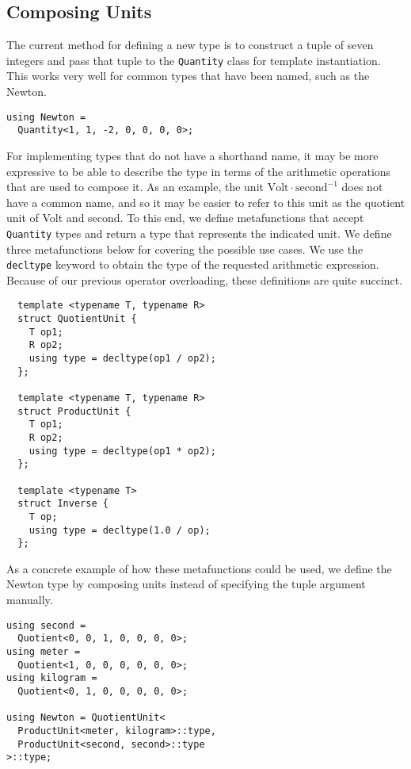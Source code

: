 \documentclass[reprint]{revtex4-1}
\begin{document}
\subsection{Composing Units}
The current method for defining a new type is to construct a tuple of seven integers and pass that
tuple to the \verb|Quantity| class for template instantiation. This works very well for common types
that have been named, such as the Newton.

\begin{verbatim}
using Newton =
  Quantity<1, 1, -2, 0, 0, 0, 0>;
\end{verbatim}

For implementing types that do not have a shorthand name, it may be more expressive to be able to
describe the type in terms of the arithmetic operations that are used to compose it. As an example, the unit
$\text{Volt} \cdot \text{second}^{-1}$ does not have a common name, and so it may be easier
to refer to this unit as the quotient unit of Volt and second.
To this end, we define metafunctions that accept \verb|Quantity| types and return a type that represents
the indicated unit. We define three metafunctions below for covering the possible use cases. We use the
\verb|decltype| keyword to obtain the type of the requested arithmetic expression. Because of our previous
operator overloading, these definitions are quite succinct.

\begin{verbatim}
  template <typename T, typename R>
  struct QuotientUnit {
    T op1;
    R op2;
    using type = decltype(op1 / op2);
  };

  template <typename T, typename R>
  struct ProductUnit {
    T op1;
    R op2;
    using type = decltype(op1 * op2);
  };

  template <typename T>
  struct Inverse {
    T op;
    using type = decltype(1.0 / op);
  };
\end{verbatim}

As a concrete example of how these metafunctions could be used, we define the Newton type by composing units
instead of specifying the tuple argument manually.

\begin{verbatim}
using second =
  Quotient<0, 0, 1, 0, 0, 0, 0>;
using meter =
  Quotient<1, 0, 0, 0, 0, 0, 0>;
using kilogram =
  Quotient<0, 1, 0, 0, 0, 0, 0>;

using Newton = QuotientUnit<
  ProductUnit<meter, kilogram>::type,
  ProductUnit<second, second>::type
>::type;
\end{verbatim}
\end{document}
